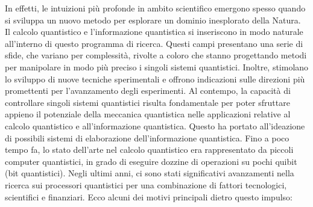 \documentclass[a4paper,12pt]{report}
\theoremstyle{plain}
\begin{document}
In effetti, le intuizioni più profonde in ambito scientifico emergono spesso quando si sviluppa un nuovo metodo per esplorare un dominio inesplorato della Natura. Il calcolo quantistico e l'informazione quantistica si inseriscono in modo naturale all'interno di questo programma di ricerca. Questi campi presentano una serie di sfide, che variano per complessità, rivolte a coloro che stanno progettando metodi per manipolare in modo più preciso i singoli sistemi quantistici. 
Inoltre, stimolano lo sviluppo di nuove tecniche sperimentali e offrono indicazioni sulle direzioni più promettenti per l'avanzamento degli esperimenti. Al contempo, la capacità di controllare singoli sistemi quantistici risulta fondamentale per poter sfruttare appieno il potenziale della meccanica quantistica nelle applicazioni relative al calcolo quantistico e all'informazione quantistica. Questo ha portato all'ideazione di possibili sistemi di elaborazione dell'informazione quantistica. 
Fino a poco tempo fa, lo stato dell'arte nel calcolo quantistico era rappresentato da piccoli computer quantistici, in grado di eseguire dozzine di operazioni su pochi quibit (bit quantistici). Negli ultimi anni, ci sono stati significativi avanzamenti nella ricerca sui processori quantistici per una combinazione di fattori tecnologici, scientifici e finanziari. 
Ecco alcuni dei motivi principali dietro questo impulso: 
\end{document}
